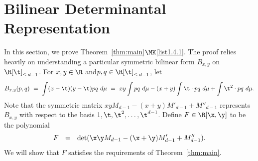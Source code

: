 \section{Bilinear Determinantal Representation}\label{sec:BilinearDetRep}
In this section, we prove Theorem~\ref{thm:main}$\MK$\eqref{list1.4.1}. The proof relies heavily on understanding a particular symmetric bilinear form $B_{x,y}$ on $\R[\t]_{\leq\,d-1}$. For $x,y\in \R$ and\linebreak $p,q\in \R[\t]_{\leq\,d-1}$, let
\[
B_{x,y}(p,q) \ = \ \int (x-\t)(y-\t) p q \ d\mu \ = \ xy\int p q \ d\mu-(x+y)\int \t\cdot p q \ d\mu+\int \t^2\cdot p q \ d\mu.
\]
Note that the symmetric matrix $xy M_{d-1} - (x+y)M'_{d-1} + M''_{d-1}$ represents $B_{x,y}$ with respect to the basis $1,\t,\t^2,\hdots, \t^{d-1}$. Define $F\in \R[\x,\y]$ to be the polynomial
\[
F\ \ = \ \ \det(\x\y M_{d-1} - (\x+\y)M'_{d-1} + M''_{d-1}).
\]
We will show that $F$ satisfies the requirements of Theorem~\ref{thm:main}.

